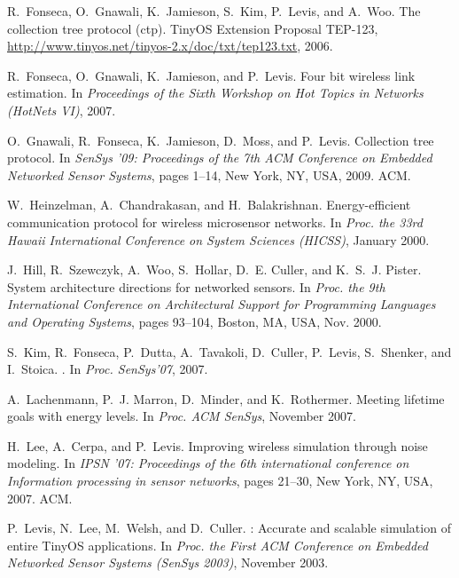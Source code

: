 \documentclass{sig-alternate}
\begin{document}
\begin{footnotesize}
\begin{thebibliography}{10}
R.~Fonseca, O.~Gnawali, K.~Jamieson, S.~Kim, P.~Levis, and A.~Woo.
\newblock The collection tree protocol (ctp).
\newblock TinyOS Extension Proposal TEP-123,
  \url{http://www.tinyos.net/tinyos-2.x/doc/txt/tep123.txt}, 2006.

R.~Fonseca, O.~Gnawali, K.~Jamieson, and P.~Levis.
\newblock Four bit wireless link estimation.
\newblock In {\em Proceedings of the Sixth Workshop on Hot Topics in Networks
  (HotNets VI)}, 2007.

O.~Gnawali, R.~Fonseca, K.~Jamieson, D.~Moss, and P.~Levis.
\newblock Collection tree protocol.
\newblock In {\em SenSys '09: Proceedings of the 7th ACM Conference on Embedded
  Networked Sensor Systems}, pages 1--14, New York, NY, USA, 2009. ACM.

W.~Heinzelman, A.~Chandrakasan, and H.~Balakrishnan.
\newblock Energy-efficient communication protocol for wireless microsensor
  networks.
\newblock In {\em Proc. the 33rd Hawaii International Conference on System
  Sciences (HICSS)}, January 2000.

J.~Hill, R.~Szewczyk, A.~Woo, S.~Hollar, D.~E. Culler, and K.~S.~J. Pister.
\newblock System architecture directions for networked sensors.
\newblock In {\em Proc. the 9th International Conference on Architectural
  Support for Programming Languages and Operating Systems}, pages 93--104,
  Boston, MA, USA, Nov. 2000.

S.~Kim, R.~Fonseca, P.~Dutta, A.~Tavakoli, D.~Culler, P.~Levis, S.~Shenker, and
  I.~Stoica.
.
\newblock In {\em Proc. SenSys'07}, 2007.

A.~Lachenmann, P.~J. Marron, D.~Minder, and K.~Rothermer.
\newblock Meeting lifetime goals with energy levels.
\newblock In {\em Proc. ACM SenSys}, November 2007.

H.~Lee, A.~Cerpa, and P.~Levis.
\newblock Improving wireless simulation through noise modeling.
\newblock In {\em IPSN '07: Proceedings of the 6th international conference on
  Information processing in sensor networks}, pages 21--30, New York, NY, USA,
  2007. ACM.

P.~Levis, N.~Lee, M.~Welsh, and D.~Culler.
: {A}ccurate and scalable simulation of entire {TinyOS}
  applications.
\newblock In {\em Proc. the First ACM Conference on Embedded Networked Sensor
  Systems (SenSys 2003)}, November 2003.


\end{thebibliography}
\end{footnotesize}
\end{document}
